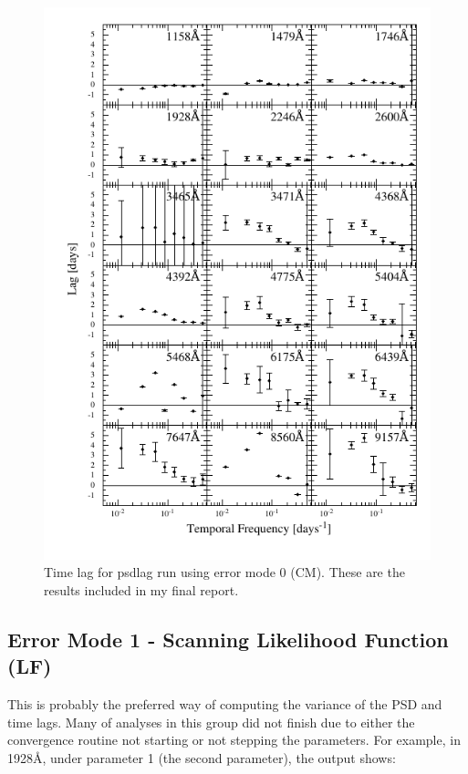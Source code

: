 \documentclass[11pt,letterpaper]{article}
\begin{document}
\begin{figure}
    \label{fig:lag_err0}
    \centering
    \includegraphics{../img/timelag_atlas_err0.pdf}
    \caption{Time lag for psdlag run using error mode 0 (CM). These are the results included in my final report. }
\end{figure}

\subsection{Error Mode 1 - Scanning Likelihood Function (LF)}
This is probably the preferred way of computing the variance of the PSD and time lags. Many of analyses in this group did not finish due to either the convergence routine not starting or not stepping the parameters. For example, in 1928\AA, under parameter 1 (the second parameter), the output shows:\\
\end{document}
